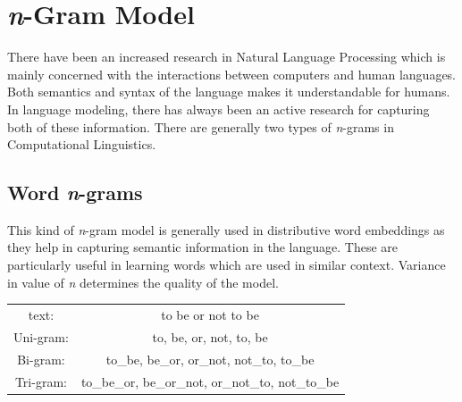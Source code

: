 \section{\textit{n}-Gram Model}
There have been an increased research in Natural Language Processing which is mainly concerned with the interactions between computers and human languages. Both semantics and syntax of the language makes it understandable for humans. In language modeling, there has always been an active research for capturing both of these information. There are generally two types of \textit{n}-grams in Computational Linguistics.

\subsection{Word \textit{n}-grams}
This kind of \textit{n}-gram model is generally used in distributive word embeddings as they help in capturing semantic information in the language. These are particularly useful in learning words which are used in similar context. Variance in value of \textit{n} determines the quality of the model. 
\begin{center}
	\begin{tabular}{ c c }
		text:& to be or not to be\\
		Uni-gram:& to, be, or, not, to, be\\
		Bi-gram:& to\_be, be\_or, or\_not, not\_to, to\_be\\
		Tri-gram:& to\_be\_or, be\_or\_not, or\_not\_to, not\_to\_be\\
	\end{tabular}
\end{center}
